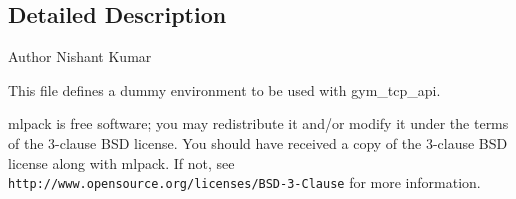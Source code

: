 \subsection{Detailed Description}
\begin{DoxyAuthor}{Author}
Nishant Kumar
\end{DoxyAuthor}
This file defines a dummy environment to be used with gym\+\_\+tcp\+\_\+api.

mlpack is free software; you may redistribute it and/or modify it under the terms of the 3-\/clause B\+SD license. You should have received a copy of the 3-\/clause B\+SD license along with mlpack. If not, see {\tt http\+://www.\+opensource.\+org/licenses/\+B\+S\+D-\/3-\/\+Clause} for more information. 